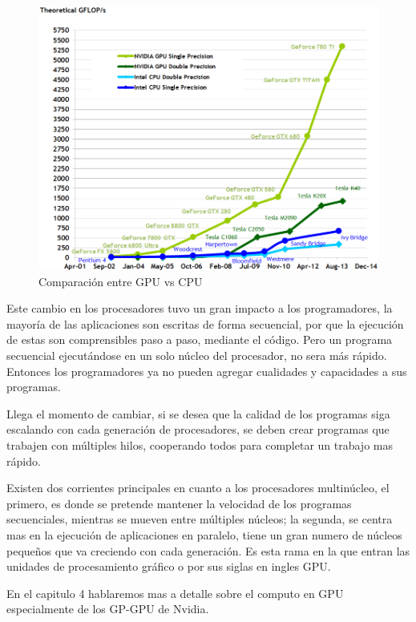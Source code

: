 \begin{figure}[ph]
			\centering
				\includegraphics[scale=0.7]{img/flops.png}
			\caption{Comparación entre GPU vs CPU \cite{Flops} }
\end{figure}

Este cambio en los procesadores tuvo un gran impacto a los programadores, la mayoría de las aplicaciones son escritas de forma secuencial,  por que la ejecución de estas son comprensibles paso a paso, mediante el código. Pero un programa secuencial ejecutándose en un solo núcleo del procesador, no sera más rápido. Entonces los programadores ya no pueden agregar cualidades y capacidades a sus programas.


Llega el momento de cambiar, si se desea que la calidad de los programas siga escalando con cada generación de procesadores, se deben crear programas que trabajen con múltiples hilos, cooperando todos para completar un trabajo mas rápido. 

Existen dos corrientes principales en cuanto a los procesadores multinúcleo, el primero, es donde se pretende mantener la velocidad de los programas secuenciales, mientras se mueven entre múltiples núcleos; la segunda, se centra mas en la ejecución de aplicaciones en paralelo, tiene un gran numero de núcleos pequeños que va creciendo con cada generación. Es esta rama en la que entran las unidades de procesamiento gráfico o por sus siglas en ingles GPU.\cite{Kirk2010} 

En el capitulo 4 hablaremos mas a detalle sobre el computo en GPU especialmente de los GP-GPU de Nvidia.



